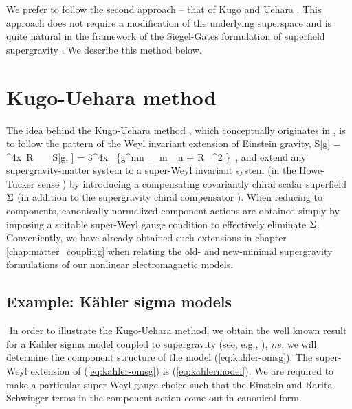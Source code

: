 We prefer to follow the second approach -- that of Kugo and Uehara \cite{Kugo:1982mr}. This approach does not require a modification of the underlying superspace and is quite natural in the framework of the Siegel-Gates formulation of superfield supergravity \cite{Siegel:1978nn,Siegel:1978mj}. We describe this method below.


\vskip0.5cm
\section{Kugo-Uehara method}
\noindent The idea behind the Kugo-Uehara method \cite{Kugo:1982mr}, which conceptually originates in \cite{Das:1978nr,Kaku:1978nz,Kaku:1978ea}, is to follow the pattern of the Weyl invariant extension of Einstein gravity, 
\be
S[g] =  \int\!^4x 
 \,{\cal R} ~ \longrightarrow ~
S[g, \vf ] = 3\int\!^4x 
  \,
\Big\{g^{mn} \, \partial_m \vf \partial_n \vf 
+  {\cal R} \, \vf^2 \Big\}~,
\ee
and extend any supergravity-matter system to a super-Weyl invariant system (in the Howe-Tucker sense  \cite{Howe:1978km}) by introducing a compensating  covariantly chiral scalar superfield $\S$ (in addition to the supergravity chiral compensator \cite{Siegel:1978nn,Siegel:1978mj}). When reducing to components, canonically  normalized component actions are obtained simply by imposing a suitable super-Weyl gauge condition to effectively eliminate $\S$. Conveniently, we have already obtained such extensions in chapter \ref{chap:matter_coupling} when relating the old- and new-minimal supergravity formulations of our nonlinear electromagnetic models.


\vskip0.5cm
\subsection{Example: K{\"a}hler sigma models}
${}$\newline
\indent In order to illustrate the Kugo-Uehara method, we obtain the well known result for a K{\"a}hler sigma model coupled to supergravity (see, e.g., \cite{Bagger:1990qh}), {\it i.e.} we will determine the component structure of the model (\ref{eq:kahler-omsg}). The super-Weyl extension of (\ref{eq:kahler-omsg}) is (\ref{eq:kahlermodel}). We are required to make a particular super-Weyl gauge choice such that the Einstein and Rarita-Schwinger terms in the component action come out in canonical form.

